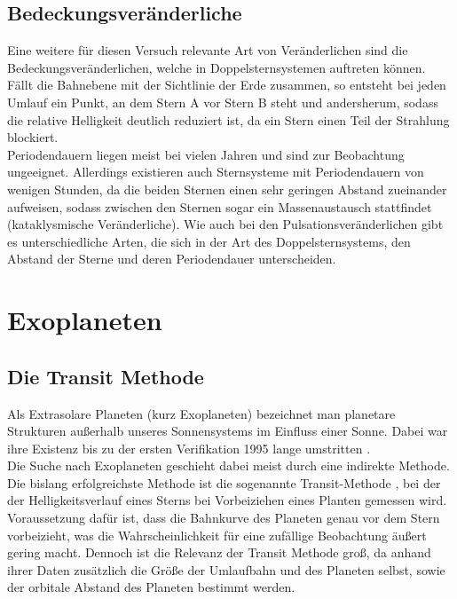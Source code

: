 \documentclass[ngerman,ruledheaders=section,class=report,thesis={type=Protokoll},accentcolor=1b,marginpar=false,parskip=half-,fontsize=11pt,]{tudapub}
\begin{document}
	\section{Bedeckungsveränderliche}
	Eine weitere für diesen Versuch relevante Art von Veränderlichen sind die Bedeckungsveränderlichen, welche in Doppelsternsystemen auftreten können. Fällt die Bahnebene mit der Sichtlinie der Erde zusammen, so entsteht bei jeden Umlauf ein Punkt, an dem Stern A vor Stern B steht und andersherum, sodass die relative Helligkeit deutlich reduziert ist, da ein Stern einen Teil der Strahlung blockiert. \\
	Periodendauern liegen meist bei vielen Jahren und sind zur Beobachtung ungeeignet. Allerdings existieren auch Sternsysteme mit Periodendauern von wenigen Stunden, da die beiden Sternen einen sehr geringen Abstand zueinander aufweisen, sodass zwischen den Sternen sogar ein Massenaustausch stattfindet (kataklysmische Veränderliche). Wie auch bei den Pulsationsveränderlichen gibt es unterschiedliche Arten, die sich in der Art des Doppelsternsystems, den Abstand der Sterne und deren Periodendauer unterscheiden.  
	
	
	\chapter{Exoplaneten}
	\section{Die Transit Methode}
	Als Extrasolare Planeten (kurz Exoplaneten) bezeichnet man planetare Strukturen außerhalb unseres Sonnensystems im Einfluss einer Sonne. Dabei war ihre Existenz bis zu der ersten Verifikation 1995 lange umstritten \cite{ExoHand}. \\
	Die Suche nach Exoplaneten geschieht dabei meist durch eine indirekte Methode. Die bislang erfolgreichste Methode ist die sogenannte Transit-Methode \cite{NasaExo}, bei der der Helligkeitsverlauf eines Sterns bei Vorbeiziehen eines Planten gemessen wird. Voraussetzung dafür ist, dass die Bahnkurve des Planeten genau vor dem Stern vorbeizieht, was die Wahrscheinlichkeit für eine zufällige Beobachtung äußert gering macht. 
	Dennoch ist die Relevanz der Transit Methode groß, da anhand ihrer Daten zusätzlich die Größe der Umlaufbahn und des Planeten selbst, sowie der orbitale Abstand des Planeten bestimmt werden.\\
	
\end{document}
